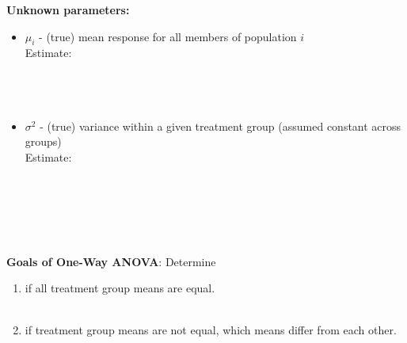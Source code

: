 \textbf{Unknown parameters:}
\begin{itemize}
\item $\mu_{i}$ - (true) mean response for all members of population $i$\\
Estimate:\\~\\~\\~\\
\item $\sigma^2$ - (true) variance within a given treatment group (assumed constant across groups)\\
Estimate:\\~\\~\\~\\~\\~\\
\end{itemize}

\textbf{Goals of One-Way ANOVA}: Determine
\begin{enumerate}
\item if all treatment group means are equal.\\~\\
\item if treatment group means are not equal, which means differ from each other.
\end{enumerate}

\newpage

